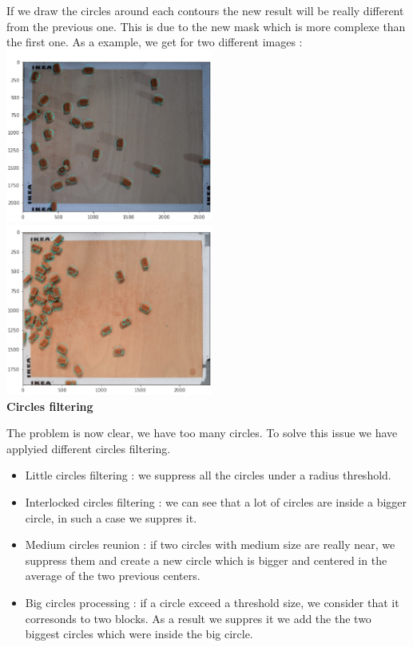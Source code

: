 \documentclass{article}
\begin{document}
If we draw the circles around each contours the new result will be really different from the previous one. This is due to the new mask which is more complexe than the first one. As a example, we get for two different images : \\
\includegraphics[width=6.8cm]{images/img32.png} 
\includegraphics[width=6.8cm]{images/img33.png}\\

\textbf{Circles filtering}

The problem is now clear, we have too many circles. To solve this issue we have applyied different circles filtering.
\begin{itemize}
 \item Little circles filtering : we suppress all the circles under a radius threshold.
 \item Interlocked circles filtering : we can see that a lot of circles are inside a bigger circle, in such a case we suppres it.
 \item Medium circles reunion : if two circles with medium size are really near, we suppress them and create a new circle which is bigger and centered in the average of the two previous centers.
 \item Big circles processing : if a circle exceed a threshold size, we consider that it corresonds to two blocks. As a result we suppres it we add the the two biggest circles which were inside the big circle.
\end{itemize}
\end{document}
